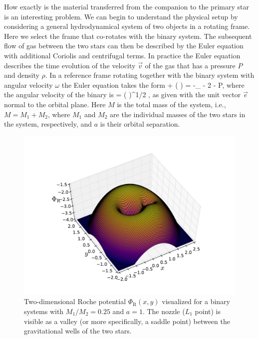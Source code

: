 How exactly is the material transferred from the companion to the primary star is an interesting problem.
We can begin to understand the physical setup by considering a general hydrodynamical system of two objects in a rotating frame.
Here we select the frame that co-rotates with the binary system. %
The subsequent flow of gas between the two stars can then be described by the Euler equation with additional Coriolis and centrifugal terms.\cite[see e.g.,][]{Cho98}
In practice the Euler equation describes the time evolution of the velocity $\vec{v}$ of the gas that has a pressure $P$ and density $\rho$.
In a reference frame rotating together with the binary system with angular velocity $\omega$ the Euler equation takes the form 
\be
{} + ( \cdot \nabla) = -\nabla \Phi_{} - 2 \vec{ \omega } \times {} -  \nabla P,
\ee
where the angular velocity of the binary is
\be
\vec{ \omega } = \left(  \right)^{1/2} ,
\ee
as given with the unit vector $\vec{e}$ normal to the orbital plane.
Here $M$ is the total mass of the system, i.e., $M = M_1 + M_2$, where $M_1$ and $M_2$ are the individual masses of the two stars in the system, respectively, and $a$ is their orbital separation.

\begin{figure}[t!]
\includegraphics[width=16cm]{figs/astro/roche.pdf}
\caption{\label{fig:roche}
    Two-dimensional Roche potential $\Phi_{\mathrm{R}}(x,y)$ visualized for a binary systems with $M_1/M_2 = 0.25$ and $a = 1$. 
    The nozzle ($L_1$ point) is visible as a valley (or more specifically, a saddle point) between the gravitational wells of the two stars.
}
\end{figure}

